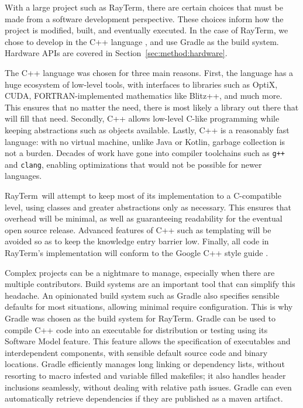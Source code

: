 \documentclass[11pt]{article}
\def\widow#1{\vskip #1\vbadness10000\penalty-200\vskip-#1}
\def\littlesection#1{
  \widow{2cm}
  \vskip 0.5cm
  \noindent{\bf #1}
  \vskip 0.0001cm
}
\newcommand{\name}{{\sc RayTerm}}
\begin{document}
With a large project such as \name, there are certain choices that must be made from a software development perspective.
These choices inform how the project is modified, built, and eventually executed.
In the case of \name, we chose to develop in the C++ language \cite{cpp14standard}, and use Gradle \cite{gradle} as the build system.
Hardware APIs are covered in Section~\ref{sec:method:hardware}.

\littlesection{Implementation Language}

The C++ language was chosen for three main reasons.
First, the language has a huge ecosystem of low-level tools, with interfaces to libraries such as OptiX, CUDA, FORTRAN-implemented mathematics like Blitz++, and much more.
This ensures that no matter the need, there is most likely a library out there that will fill that need.
Secondly, C++ allows low-level C-like programming while keeping abstractions such as objects available.
Lastly, C++ is a reasonably fast language: with no virtual machine, unlike Java or Kotlin, garbage collection is not a burden.
Decades of work have gone into compiler toolchains such as \texttt{g++} and \texttt{clang}, enabling optimizations that would not be possible for newer languages.

\name\ will attempt to keep most of its implementation to a C-compatible level, using classes and greater abstractions only as necessary.
This ensures that overhead will be minimal, as well as guaranteeing readability for the eventual open source release.
Advanced features of C++ such as templating will be avoided so as to keep the knowledge entry barrier low.
Finally, all code in \name's implementation will conform to the Google C++ style guide \cite{googleStyleGuide}.

\littlesection{Build System}

Complex projects can be a nightmare to manage, especially when there are multiple contributors.
Build systems are an important tool that can simplify this headache.
An opinionated build system such as Gradle also specifies sensible defaults for most situations, allowing minimal require configuration.
This is why Gradle was chosen as the build system for \name.
Gradle can be used to compile C++ code into an executable for distribution or testing using its Software Model feature.
This feature allows the specification of executables and interdependent components, with sensible default source code and binary locations.
Gradle efficiently manages long linking or dependency lists, without resorting to macro infested and variable filled makefiles; it also handles header inclusions seamlessly, without dealing with relative path issues.
Gradle can even automatically retrieve dependencies if they are published as a maven artifact.
\end{document}
